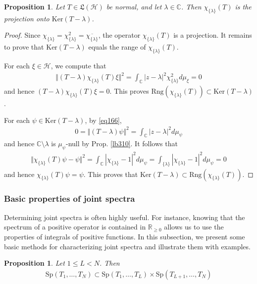 \documentclass[12pt,b5paper,notitlepage]{article}
\theoremstyle{definition}
\theoremstyle{plain}
\newtheorem{pp}[df]{Proposition}
\newcommand{\fk}{\mathfrak}
\newcommand{\ovl}{\overline}
\newcommand{\Cbb}{\mathbb C}
\newcommand{\Rbb}{\mathbb R}
\newcommand{\Ker}{\mathrm{Ker}}
\newcommand{\Sp}{\mathrm{Sp}}
\newcommand{\Rng}{\mathrm{Rng}}
\newcommand{\MH}{\mathcal H}
\numberwithin{equation}{section}
\begin{document}
\begin{pp}\label{lb317}
Let $T\in\fk L(\MH)$ be normal, and let $\lambda\in\Cbb$. Then $\chi_{\{\lambda\}}(T)$ is the projection onto $\Ker(T-\lambda)$.
\end{pp}


\begin{proof}
Since $\chi_{\{\lambda\}}=\chi_{\{\lambda\}}^2=\ovl{\chi_{\{\lambda\}}}$, the operator $\chi_{\{\lambda\}}(T)$ is a projection. It remains to prove that $\Ker(T-\lambda)$ equals the range of $\chi_{\{\lambda\}}(T)$.

For each $\xi\in\MH$, we compute that
\begin{align*}
\Vert (T-\lambda)\chi_{\{\lambda\}}(T)\xi\Vert^2=\int_\Cbb |z-\lambda|^2\chi_{\{\lambda\}}^2d\mu_\xi=0
\end{align*}
and hence $(T-\lambda)\chi_{\{\lambda\}}(T)\xi=0$. This proves $\Rng(\chi_{\{\lambda\}}(T))\subset\Ker(T-\lambda)$.


For each $\psi\in\Ker(T-\lambda)$, by \eqref{eq166},
\begin{align*}
0=\Vert (T-\lambda)\psi\Vert^2=\int_\Cbb |z-\lambda|^2d\mu_\psi
\end{align*}
and hence $\Cbb\setminus\lambda$ is $\mu_\psi$-null by Prop. \ref{lb310}. It follows that
\begin{align*}
\Vert \chi_{\{\lambda\}}(T)\psi-\psi\Vert^2=\int_\Cbb |\chi_{\{\lambda\}}-1|^2d\mu_\psi=\int_{\{\lambda\}} |\chi_{\{\lambda\}}-1|^2d\mu_\psi=0
\end{align*}
and hence $\chi_{\{\lambda\}}(T)\psi=\psi$. This proves that $\Ker(T-\lambda)\subset\Rng(\chi_{\{\lambda\}}(T))$.
\end{proof}


\subsubsection{Basic properties of joint spectra}

Determining joint spectra is often highly useful. For instance, knowing that the spectrum of a positive operator is contained in $\Rbb_{\geq0}$ allows us to use the properties of integrals of positive functions. In this subsection, we present some basic methods for characterizing joint spectra and illustrate them with examples.


\begin{pp}\label{lb307}
Let $1\leq L<N$. Then
\begin{align}
\Sp(T_1,\dots,T_N)\subset\Sp(T_1,\dots,T_L)\times\Sp(T_{L+1},\dots,T_N)
\end{align}
\end{pp}
\end{document}
